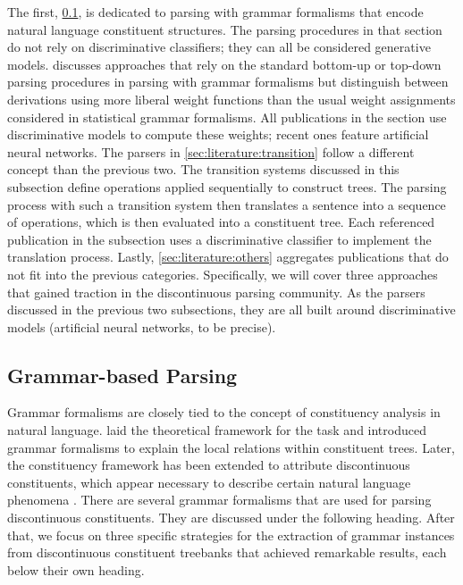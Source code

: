 \documentclass[../document.tex]{subfiles}
\begin{document}
    The first, \cref{sec:literature:grammar}, is dedicated to parsing with grammar formalisms that encode natural language constituent structures.
    The parsing procedures in that section do not rely on discriminative classifiers; they can all be considered generative models.
     discusses approaches that rely on the standard bottom-up or top-down parsing procedures in parsing with grammar formalisms but distinguish between derivations using more liberal weight functions than the usual weight assignments considered in statistical grammar formalisms.
    All publications in the section use discriminative models to compute these weights; recent ones feature artificial neural networks.
    The parsers in \cref{sec:literature:transition} follow a different concept than the previous two.
    The transition systems discussed in this subsection define operations applied sequentially to construct trees.
    The parsing process with such a transition system then translates a sentence into a sequence of operations, which is then evaluated into a constituent tree.
    Each referenced publication in the subsection uses a discriminative classifier to implement the translation process.
    Lastly, \cref{sec:literature:others} aggregates publications that do not fit into the previous categories.
    Specifically, we will cover three approaches that gained traction in the discontinuous parsing community.
    As the parsers discussed in the previous two subsections, they are all built around discriminative models (artificial neural networks, to be precise).

    \subsection{Grammar-based Parsing}\label{sec:literature:grammar}
    Grammar formalisms are closely tied to the concept of constituency analysis in natural language.
     laid the theoretical framework for the task and introduced grammar formalisms to explain the local relations within constituent trees.
    Later, the constituency framework has been extended to attribute discontinuous constituents, which appear necessary to describe certain natural language phenomena \citep{Shieber85}.
    There are several grammar formalisms that are used for parsing discontinuous constituents.
    They are discussed under the following heading.
    After that, we focus on three specific strategies for the extraction of grammar instances from discontinuous constituent treebanks that achieved remarkable results, each below their own heading.
\end{document}
